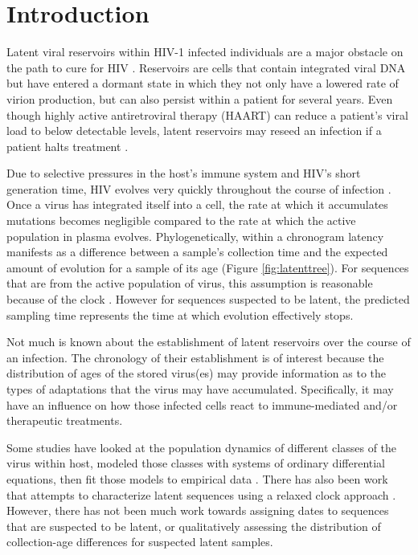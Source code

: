 \section{Introduction} \label{sec:intro}
Latent viral reservoirs within HIV-1 infected individuals are a major obstacle on the path to cure for HIV \citep{Pace11}. 
Reservoirs are cells that contain integrated viral DNA but have entered a dormant state in which they not only have a lowered rate of virion production, but can also persist within a patient for several years.
Even though highly active antiretroviral therapy (HAART) can reduce a patient's viral load to below detectable levels, latent reservoirs may reseed an infection if a patient halts treatment \citep{Joos08, Pomerantz03, Richman09}.


Due to selective pressures in the host's immune system and HIV's short generation time, HIV evolves very quickly throughout the course of infection \citep{Alizon13, Shankarappa99, Rambaut04}. 
Once a virus has integrated itself into a cell, the rate at which it accumulates mutations becomes negligible compared to the rate at which the active population in plasma evolves. 
Phylogenetically, within a chronogram latency manifests as a difference between a sample's collection time and the expected amount of evolution for a sample of its age (Figure \ref{fig:latenttree}). 
For sequences that are from the active population of virus, this assumption is reasonable because of the clock \citep{}.  However for sequences suspected to be latent, the predicted sampling time represents the time at which evolution effectively stops.

Not much is known about the establishment of latent reservoirs over the course of an infection. 
The chronology of their establishment is of interest because the distribution of ages of the stored virus(es) may provide information as to the types of adaptations that the virus may have accumulated. 
Specifically, it may have an influence on how those infected cells react to immune-mediated and/or therapeutic treatments. 

Some studies have looked at the population dynamics of different classes of the virus within host, modeled those classes with systems of ordinary differential equations, then fit those models to empirical data \citep{Althaus14}. 
There has also been work that attempts to characterize latent sequences using a relaxed clock approach \citep{Immonen14}. 
However, there has not been much work towards assigning dates to sequences that are suspected to be latent, or qualitatively assessing the distribution of collection-age differences for suspected latent samples.

